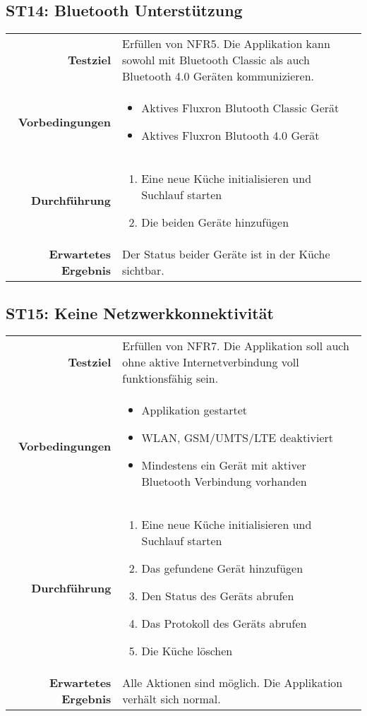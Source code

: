 \subsection{ST14: Bluetooth Unterstützung}
\begin{table}[H]
\begin{tabularx}{\textwidth}{r X }
\textbf{Testziel} & Erfüllen von \ac{NFR}5. Die Applikation kann sowohl mit Bluetooth Classic als auch Bluetooth 4.0 Geräten kommunizieren. \\
\textbf{Vorbedingungen} & \begin{itemize}
\item Aktives Fluxron Blutooth Classic Gerät
\item Aktives Fluxron Blutooth 4.0 Gerät
\end{itemize}\\
\textbf{Durchführung} & \begin{enumerate}
\item Eine neue Küche initialisieren und Suchlauf starten
\item Die beiden Geräte hinzufügen
\end{enumerate} \\
\textbf{Erwartetes Ergebnis} & Der Status beider Geräte ist in der Küche sichtbar.\\
\end{tabularx}
\end{table}

\subsection{ST15: Keine Netzwerkkonnektivität}
\begin{table}[H]
\begin{tabularx}{\textwidth}{r X }
\textbf{Testziel} & Erfüllen von \ac{NFR}7. Die Applikation soll auch ohne aktive Internetverbindung voll funktionsfähig sein. \\
\textbf{Vorbedingungen} & \begin{itemize}
\item Applikation gestartet
\item WLAN, GSM/UMTS/LTE deaktiviert
\item Mindestens ein Gerät mit aktiver Bluetooth Verbindung vorhanden
\end{itemize}\\
\textbf{Durchführung} & \begin{enumerate}
\item Eine neue Küche initialisieren und Suchlauf starten
\item Das gefundene Gerät hinzufügen
\item Den Status des Geräts abrufen
\item Das Protokoll des Geräts abrufen
\item Die Küche löschen
\end{enumerate} \\
\textbf{Erwartetes Ergebnis} & Alle Aktionen sind möglich. Die Applikation verhält sich normal.\\
\end{tabularx}
\end{table}

